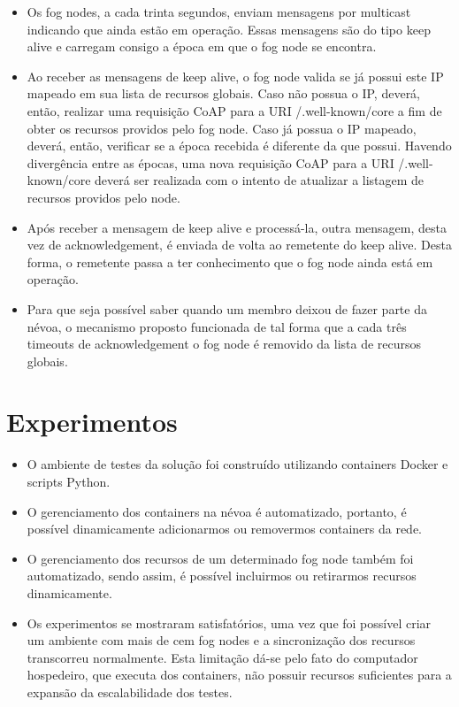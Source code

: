 \documentclass[a0,portrait]{lab-poster}
\begin{document}
\begin{multicols}{2}
\begin{itemize}
\item Os fog nodes, a cada trinta segundos, enviam mensagens por multicast indicando que ainda estão em operação.
Essas mensagens são do tipo keep alive e carregam consigo a época em que o fog node se encontra. 

\item Ao receber as mensagens de keep alive, o fog node valida se já possui este IP mapeado em sua lista de recursos globais.
Caso não possua o IP, deverá, então, realizar uma requisição CoAP para a URI /.well-known/core a fim de obter os recursos providos pelo fog node.
Caso já possua o IP mapeado, deverá, então, verificar se a época recebida é diferente da que possui.
Havendo divergência entre as épocas, uma nova requisição CoAP para a URI /.well-known/core deverá ser realizada com o intento de atualizar a listagem de recursos providos pelo node.

\item Após receber a mensagem de keep alive e processá-la, outra mensagem, desta vez de acknowledgement, é enviada de volta ao remetente do keep alive.
Desta forma, o remetente passa a ter conhecimento que o fog node ainda está em operação.

\item Para que seja possível saber quando um membro deixou de fazer parte da névoa, o mecanismo proposto funcionada de tal forma que a cada três timeouts de acknowledgement
o fog node é removido da lista de recursos globais.

\end{itemize}

\section*{\huge Experimentos}

\Large
\justifying
\begin{itemize}

\item O ambiente de testes da solução foi construído utilizando containers Docker e scripts Python.
\item O gerenciamento dos containers na névoa é automatizado, portanto, é possível dinamicamente adicionarmos ou removermos containers da rede.
\item O gerenciamento dos recursos de um determinado fog node também foi automatizado, sendo assim, é possível incluirmos ou retirarmos recursos dinamicamente.
\item Os experimentos se mostraram satisfatórios, uma vez que foi possível criar um ambiente com mais de cem fog nodes e a sincronização dos recursos transcorreu normalmente.
Esta limitação dá-se pelo fato do computador hospedeiro, que executa dos containers, não possuir recursos suficientes para a expansão da escalabilidade dos testes.



\end{itemize}
\end{multicols}
\end{document}
